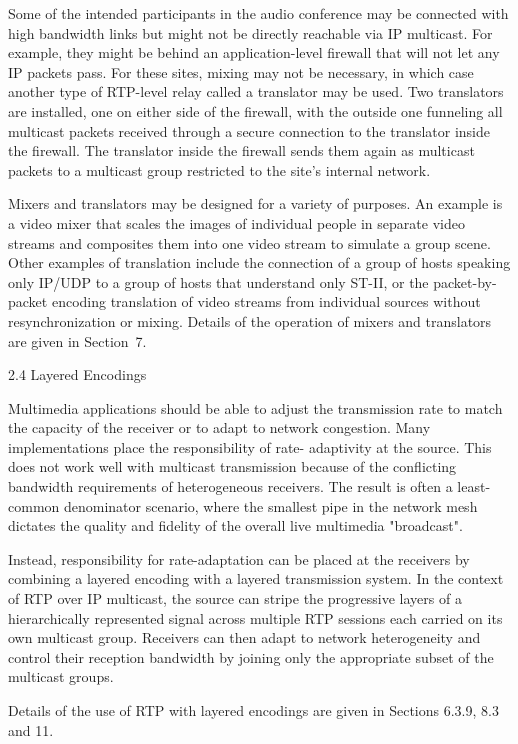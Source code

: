 \documentclass{article}
\begin{document}
Some of the intended participants in the audio conference may be connected with high bandwidth links but might not be directly reachable via IP multicast.  For example, they might be behind an application-level firewall that will not let any IP packets pass. For these sites, mixing may not be necessary, in which case another type of RTP-level relay called a translator may be used.  Two translators are installed, one on either side of the firewall, with the outside one funneling all multicast packets received through a secure connection to the translator inside the firewall.  The translator inside the firewall sends them again as multicast packets to a multicast group restricted to the site's internal network.

Mixers and translators may be designed for a variety of purposes.  An example is a video mixer that scales the images of individual people in separate video streams and composites them into one video stream to simulate a group scene.  Other examples of translation include the connection of a group of hosts speaking only IP/UDP to a group of hosts that understand only ST-II, or the packet-by-packet encoding translation of video streams from individual sources without resynchronization or mixing.  Details of the operation of mixers and translators are given in Section~7.

2.4 Layered Encodings

Multimedia applications should be able to adjust the transmission rate to match the capacity of the receiver or to adapt to network congestion.  Many implementations place the responsibility of rate- adaptivity at the source.  This does not work well with multicast transmission because of the conflicting bandwidth requirements of heterogeneous receivers.  The result is often a least-common denominator scenario, where the smallest pipe in the network mesh dictates the quality and fidelity of the overall live multimedia "broadcast".

Instead, responsibility for rate-adaptation can be placed at the receivers by combining a layered encoding with a layered transmission system.  In the context of RTP over IP multicast, the source can stripe the progressive layers of a hierarchically represented signal across multiple RTP sessions each carried on its own multicast group. Receivers can then adapt to network heterogeneity and control their reception bandwidth by joining only the appropriate subset of the multicast groups.

Details of the use of RTP with layered encodings are given in Sections 6.3.9, 8.3 and 11.
\end{document}
